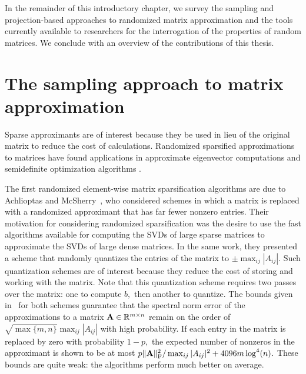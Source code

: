In the remainder of this introductory chapter, we survey the sampling and projection-based
approaches to randomized matrix approximation and the tools
currently available to researchers for the interrogation of the properties of random matrices. We conclude
with an overview of the contributions of this thesis.

\section{The sampling approach to matrix approximation}

Sparse approximants are of interest because they be used in lieu of the original matrix to reduce 
the cost of calculations. Randomized sparsified approximations to matrices have found applications in
approximate eigenvector computations \cite{AM01,AHK06,AM07} and semidefinite optimization
algorithms \cite{AHK05,dAsp07}.

The first randomized element-wise matrix sparsification algorithms are due to 
Achlioptas and McSherry~\cite{AM01,AM07}, who considered schemes 
in which a matrix is replaced with a randomized approximant 
that has far fewer nonzero entries.
Their motivation for considering randomized sparsification
was the desire to use the fast algorithms available for computing the SVDs of large sparse matrices to 
approximate the SVDs of large dense matrices. In the same work, 
they presented a scheme that randomly quantizes the entries of the 
matrix to ${\pm \max_{ij} |A_{ij}|}.$ Such quantization schemes 
are of interest because they reduce the cost of storing and working with the matrix. 
Note that this quantization scheme requires two passes over the matrix: one to compute $b,$ then another to quantize.
The bounds given in~\cite{AM07} for both schemes guarantee that the spectral norm error of the 
approximations to a matrix $\mathbf{A} \in \mathbb{R}^{m \times n}$ remain on the order of $\sqrt{\max\{m,n\}} \max_{ij} |A_{ij}|$ with high
probability. If each entry in the matrix is replaced by zero with probability $1-p,$ the expected
number of nonzeros in the approximant is shown to be at most $p \|\mathbf{A}\|_{\mathrm{F}}^2/\max_{ij} |A_{ij}|^2 + 4096m\log^4(n).$
These bounds are quite weak: the algorithms perform much better on average.

